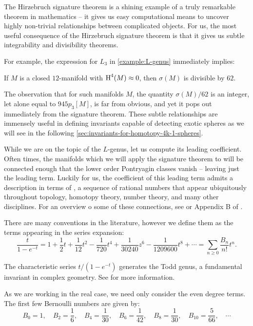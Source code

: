The Hirzebruch signature theorem is a shining example of a truly remarkable theorem in mathematics -- it gives us easy computational means to uncover highly non-trivial relationships between complicated objects. For us, the most useful consequence of the Hirzebruch signature theorem is that it gives us subtle integrability and divisibility theorems. 

For example, the expression for $L_3$ in \cref{example:L-genus} immediately implies:
\begin{corollary}
	If $M$ is a closed $12$-manifold with $\operatorname{H}^4(M)\approx 0$, then $\sigma(M)$ is divisible by $62$.
\end{corollary}
\noindent
The observation that for such manifolds $M$, the quantity $\sigma(M)/62$ is an integer, let alone equal to $945p_3[M]$, is far from obvious, and yet it pops out immediately from the signature theorem. These subtle relationships are immensely useful in defining invariants capable of detecting exotic spheres as we will see in the following \cref{sec:invariants-for-homotopy-4k-1-spheres}.

While we are on the topic of the $L$-genus, let us compute its leading coefficient. Often times, the manifolds which we will apply the signature theorem to will be connected enough that the lower order Pontryagin classes vanish -- leaving just the leading term.
Luckily for us, the coefficient of this leading term admits a description in terms of , a sequence of rational numbers that appear ubiquitously throughout topology, homotopy theory, number theory, and many other disciplines. For an overview o some of these connections, see \cite{mazurbernoulli} or Appendix B of \cite{milnorstasheff1974}.

There are many conventions in the literature, however we define them as the terms appearing in the series expansion:
\[
	\frac{t}{1-e^{-t}} =  1+\frac{1}{2}t + \frac{1}{12}t^2-\frac{1}{720}t^4+\frac{1}{30240}z^6-\frac{1}{1209600}t^8+\cdots=\sum_{n\geq 0}\frac{B_n}{n!}t^n.
\]
\begin{remark*}
	The characteristic series $t/(1-e^{-t})$ generates the Todd genus, a fundamental invariant in complex geometry. See \cite{hirzebruch1966methods} for more information.
\end{remark*}
As we are working in the real case, we need only consider the even degree terms. The first few Bernoulli numbers are given by:
\begin{equation}\label{eq:bernoulli_numbers}
	B_0 = 1,\quad B_2 = \frac{1}{6},\quad B_4 = \frac{1}{30},\quad B_6=\frac{1}{42},\quad B_{8}=\frac{1}{30},\quad B_{10} = \frac{5}{66},\quad\cdots
\end{equation}


